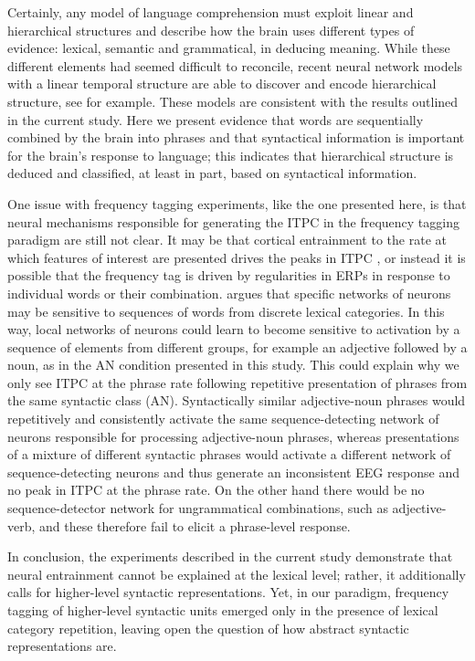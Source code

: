 \documentclass[10pt,letterpaper]{article}
\newcommand{\citet}[1]{\cite{#1}}
\begin{document}
Certainly, any model of language comprehension must exploit linear and
hierarchical structures and describe how the brain uses different
types of evidence: lexical, semantic and grammatical, in deducing
meaning. While these different elements had seemed difficult to
reconcile, recent neural network models with a linear temporal
structure are able to discover and encode hierarchical structure, see
\citet{LakretzEtAl2019,Baroni2019} for example. These models are
consistent with the results outlined in the current study. Here we
present evidence that words are sequentially combined by the brain
into phrases and that syntactical information is important for the
brain's response to language; this indicates that hierarchical
structure is deduced and classified, at least in part, based on
syntactical information.


One issue with frequency tagging experiments, like the one presented
here, is that neural mechanisms responsible for generating the ITPC in
the frequency tagging paradigm are still not clear. It may be that
cortical entrainment to the rate at which features of interest are
presented drives the peaks in ITPC \cite{Meyer2018}, or instead it is
possible that the frequency tag is driven by regularities in ERPs in
response to individual words or their
combination. \citet{PulvermullerEtAl2002} argues that specific
networks of neurons may be sensitive to sequences of words from
discrete lexical categories. In this way, local networks of neurons
could learn to become sensitive to activation by a sequence of
elements from different groups, for example an adjective followed by a
noun, as in the AN condition presented in this study. This could
explain why we only see ITPC at the phrase rate following repetitive
presentation of phrases from the same syntactic class
(AN). Syntactically similar adjective-noun phrases would repetitively
and consistently activate the same sequence-detecting network of
neurons responsible for processing adjective-noun phrases, whereas
presentations of a mixture of different syntactic phrases would
activate a different network of sequence-detecting neurons and thus
generate an inconsistent EEG response and no peak in ITPC at the
phrase rate. On the other hand there would be no sequence-detector
network for ungrammatical combinations, such as adjective-verb, and
these therefore fail to elicit a phrase-level response.

In conclusion, the experiments described in the current study
demonstrate that neural entrainment cannot be explained at the lexical
level; rather, it additionally calls for higher-level syntactic
representations. Yet, in our paradigm, frequency tagging of
higher-level syntactic units emerged only in the presence of lexical
category repetition, leaving open the question of how abstract
syntactic representations are.
\end{document}

